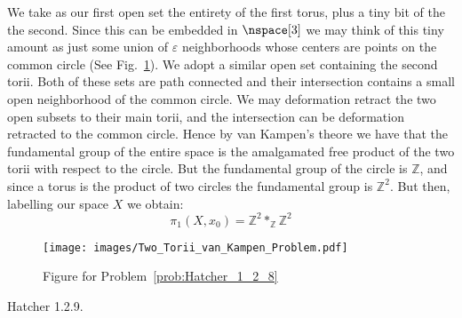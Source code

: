 \documentclass{book}                                                           %
\begin{document}
\begin{solution}
    We take as our first open set the entirety of the first torus, plus a
    tiny bit of the the second. Since this can be embedded in $\nspace[3]$
    we may think of this tiny amount as just some union of $\varepsilon$
    neighborhoods whose centers are points on the common circle
    (See Fig.~\ref{fig:Fig_Prob_Hatcher_1_2_8a}). We adopt a similar open set
    containing the second torii. Both of these sets are path connected and
    their intersection contains a small open neighborhood of the common
    circle. We may deformation retract the two open subsets to their main
    torii, and the intersection can be deformation retracted to the common
    circle. Hence by van Kampen's theore we have that the fundamental group
    of the entire space is the amalgamated free product of the two torii
    with respect to the circle. But the fundamental group of the circle is
    $\mathbb{Z}$, and since a torus is the product of two circles the
    fundamental group is $\mathbb{Z}^{2}$. But then, labelling our space $X$
    we obtain:
    \begin{equation}
        \pi_{1}(X,x_{0})=\mathbb{Z}^{2}*_{\mathbb{Z}}\mathbb{Z}^{2}
    \end{equation}
    \begin{figure}[H]
        \centering
        \captionsetup{type=figure}
        \texttt{[image: images/Two\_Torii\_van\_Kampen\_Problem.pdf]}
        \caption{Figure for Problem~\ref{prob:Hatcher_1_2_8}}
        \label{fig:Fig_Prob_Hatcher_1_2_8a}
    \end{figure}
\end{solution}
\begin{problem}
    \label{prob:Hatcher_1_2_9}%
    Hatcher 1.2.9.
\end{problem}
\end{document}
